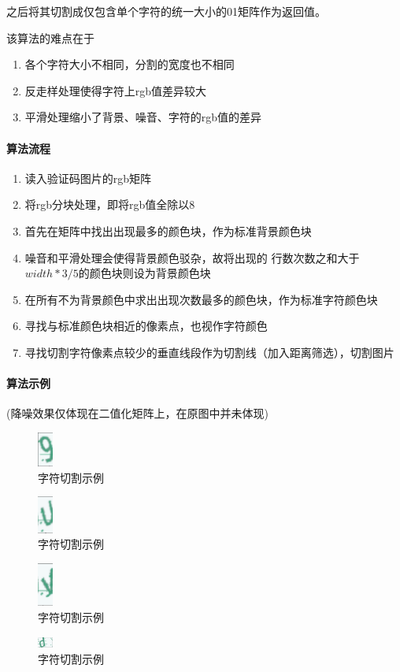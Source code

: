 \documentclass[11pt,UTF8]{article}
\begin{document}
	之后将其切割成仅包含单个字符的统一大小的01矩阵作为返回值。

	该算法的难点在于
	\begin{enumerate}
	\item 各个字符大小不相同，分割的宽度也不相同
	\item 反走样处理使得字符上rgb值差异较大
	\item 平滑处理缩小了背景、噪音、字符的rgb值的差异
	\end{enumerate}
\paragraph{算法流程}
	\begin{enumerate}
	\item 读入验证码图片的rgb矩阵
	\item 将rgb分块处理，即将rgb值全除以8
	\item 首先在矩阵中找出出现最多的颜色块，作为标准背景颜色块
	\item 噪音和平滑处理会使得背景颜色驳杂，故将出现的
		行数次数之和大于$width*3/5$的颜色块则设为背景颜色块
	\item 在所有不为背景颜色中求出出现次数最多的颜色块，作为标准字符颜色块
	\item 寻找与标准颜色块相近的像素点，也视作字符颜色
	\item 寻找切割字符像素点较少的垂直线段作为切割线（加入距离筛选），切割图片
	\end{enumerate}
\newpage
\paragraph{算法示例}
	(降噪效果仅体现在二值化矩阵上，在原图中并未体现)

	\begin{figure}[H]
		\centering
		\includegraphics[width=0.2in]{9.png}
		\caption{字符切割示例}\label{results}
	\end{figure}
	\begin{figure}[H]
		\centering
		\includegraphics[width=0.2in]{U.png}
		\caption{字符切割示例}\label{results}
	\end{figure}
	\begin{figure}[H]
		\centering
		\includegraphics[width=0.2in]{y.png}
		\caption{字符切割示例}\label{results}
	\end{figure}
	\begin{figure}[H]
		\centering
		\includegraphics[width=0.2in]{d.png}
		\caption{字符切割示例}\label{results}
	\end{figure}
\newpage
\end{document}

